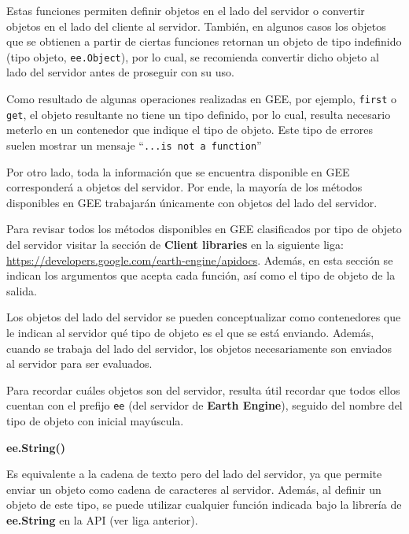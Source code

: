 \documentclass[
]{article}
\begin{document}
Estas funciones permiten definir objetos en el lado del servidor o
convertir objetos en el lado del cliente al servidor. También, en
algunos casos los objetos que se obtienen a partir de ciertas funciones
retornan un objeto de tipo indefinido (tipo objeto, \texttt{ee.Object}),
por lo cual, se recomienda convertir dicho objeto al lado del servidor
antes de proseguir con su uso.

\begin{tipblock}
Como resultado de algunas operaciones realizadas en GEE, por ejemplo,
\texttt{first} o \texttt{get}, el objeto resultante no tiene un tipo
definido, por lo cual, resulta necesario meterlo en un contenedor que
indique el tipo de objeto. Este tipo de errores suelen mostrar un
mensaje ``\texttt{...is\ not\ a\ function}''

\end{tipblock}

Por otro lado, toda la información que se encuentra disponible en GEE
corresponderá a objetos del servidor. Por ende, la mayoría de los
métodos disponibles en GEE trabajarán únicamente con objetos del lado
del servidor.

\begin{tipblock}
Para revisar todos los métodos disponibles en GEE clasificados por tipo
de objeto del servidor visitar la sección de \textbf{Client libraries}
en la siguiente liga:
\url{https://developers.google.com/earth-engine/apidocs}. Además, en
esta sección se indican los argumentos que acepta cada función, así como
el tipo de objeto de la salida.

\end{tipblock}

Los objetos del lado del servidor se pueden conceptualizar como
contenedores que le indican al servidor qué tipo de objeto es el que se
está enviando. Además, cuando se trabaja del lado del servidor, los
objetos necesariamente son enviados al servidor para ser evaluados.

\begin{tipblock}
Para recordar cuáles objetos son del servidor, resulta útil recordar que
todos ellos cuentan con el prefijo \texttt{ee} (del servidor de
\textbf{Earth Engine}), seguido del nombre del tipo de objeto con
inicial mayúscula.

\end{tipblock}

\textbf{ee.String()}

Es equivalente a la cadena de texto pero del lado del servidor, ya que
permite enviar un objeto como cadena de caracteres al servidor. Además,
al definir un objeto de este tipo, se puede utilizar cualquier función
indicada bajo la librería de \textbf{ee.String} en la API (ver liga
anterior).
\end{document}
